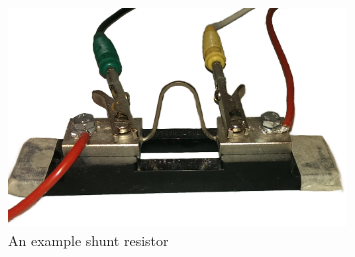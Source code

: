 \begin{figure}
    \centering
    \includegraphics[width=0.8\textwidth]{figs/shunt.jpg}
    \caption{An example shunt resistor}
    \label{fig:shunt}
\end{figure}


